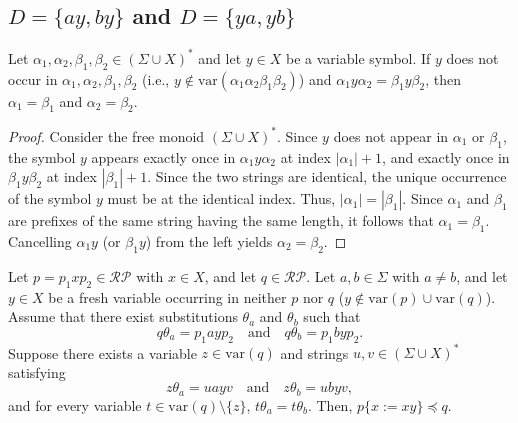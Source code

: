 

\subsection{$D=\{ ay, by \}$ and $D=\{ ya, yb \}$}\label{subsec:d2}

{\color{red}
\begin{prop}\label{prop:fresh_var_factorization}
Let $\alpha_1, \alpha_2, \beta_1, \beta_2 \in (\Sigma \cup X)^*$ and let $y \in X$ be a variable symbol. 
If $y$ does not occur in $\alpha_1, \alpha_2, \beta_1, \beta_2$ (i.e., $y \notin \mathrm{var}(\alpha_1\alpha_2\beta_1\beta_2)$) and
$\alpha_1 y \alpha_2 = \beta_1 y \beta_2$, 
then $\alpha_1 = \beta_1$ and $\alpha_2 = \beta_2$.
\end{prop}

\begin{proof}
Consider the free monoid $(\Sigma \cup X)^*$. 
Since $y$ does not appear in $\alpha_1$ or $\beta_1$, the symbol $y$ appears exactly once in $\alpha_1 y \alpha_2$ at index $|\alpha_1| + 1$, and exactly once in $\beta_1 y \beta_2$ at index $|\beta_1| + 1$. 
Since the two strings are identical, the unique occurrence of the symbol $y$ must be at the identical index. 
Thus, $|\alpha_1| = |\beta_1|$.
Since $\alpha_1$ and $\beta_1$ are prefixes of the same string having the same length, it follows that $\alpha_1 = \beta_1$. 
Cancelling $\alpha_1 y$ (or $\beta_1 y$) from the left yields $\alpha_2 = \beta_2$.
\end{proof}

\begin{lem}\label{lem:boundary-absorption}
Let $p = p_1 x p_2 \in \mathcal{RP}$ with $x \in X$, and let $q \in \mathcal{RP}$. 
Let $a, b \in \Sigma$ with $a \neq b$, and let $y \in X$ be a fresh variable occurring in neither $p$ nor $q$ ($y \notin \mathrm{var}(p) \cup \mathrm{var}(q)$).
Assume that there exist substitutions $\theta_a$ and $\theta_b$ such that
\begin{equation}\label{eq:hyp_images}
q\theta_a = p_1 a y p_2 \quad \text{and} \quad q\theta_b = p_1 b y p_2.
\end{equation}
Suppose there exists a variable $z \in \mathrm{var}(q)$ and strings $u, v \in (\Sigma \cup X)^*$ satisfying
\begin{equation}\label{eq:z_images}
z\theta_a = u a y v \quad \text{and} \quad z\theta_b = u b y v,
\end{equation}
and for every variable $t \in \mathrm{var}(q) \setminus \{z\}$, $t\theta_a = t\theta_b$.
Then,
$
p\{x := x y\} \preceq q.
$
\end{lem}

}
